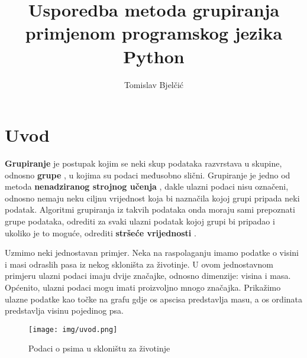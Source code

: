 \documentclass[times, utf8, zavrsni]{fer}
\begin{document}

\title{Usporedba metoda grupiranja primjenom programskog jezika Python}

\author{Tomislav Bjelčić}

\maketitle

\izvornik

\zahvala{}

\tableofcontents

\chapter{Uvod}

\textbf{Grupiranje}  je postupak kojim se neki skup podataka razvrstava u skupine, odnosno \textbf{grupe} , u kojima su podaci međusobno slični. Grupiranje je jedno od metoda \textbf{nenadziranog strojnog učenja} , dakle ulazni podaci nisu označeni, odnosno nemaju neku ciljnu vrijednost koja bi naznačila kojoj grupi pripada neki podatak. Algoritmi grupiranja iz takvih podataka onda moraju sami prepoznati grupe podataka, odrediti za svaki ulazni podatak kojoj grupi bi pripadao i ukoliko je to moguće, odrediti \textbf{stršeće vrijednosti} .

Uzmimo neki jednostavan primjer. Neka na raspolaganju imamo podatke o visini i masi odraslih pasa iz nekog 
skloništa za životinje. U ovom jednostavnom primjeru ulazni podaci imaju dvije značajke, odnosno dimenzije: visina i masa. Općenito, ulazni podaci mogu imati proizvoljno mnogo značajka. Prikažimo ulazne podatke kao 
točke na grafu gdje os apscisa predstavlja masu, a os ordinata predstavlja visinu pojedinog psa.

\begin{figure}[H]
    \centering
    \texttt{[image: img/uvod.png]}
    \caption{Podaci o psima u skloništu za životinje}
\end{figure}
\end{document}
